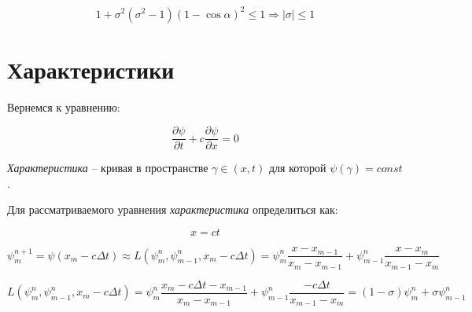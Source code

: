\documentclass[10pt,a4paper]{article}
\begin{document}
	\begin{equation}
		1 +\sigma^{2}\left(\sigma^{2} - 1\right)\left(1 - \cos\alpha\right)^{2} 
		\leqslant 1 \Rightarrow \left|\sigma\right|\leqslant 1
	\end{equation}
	
	\section{Характеристики}
	
	Вернемся к уравнению:
	
	\begin{equation}
		\frac{\partial \psi}{\partial t} + c\frac{\partial \psi}{\partial x} = 0
	\end{equation}
	
	\textit{Характеристика} -- кривая в пространстве $\gamma \in \left(x, t
	\right)$ для которой $\psi\left(\gamma\right) = const$.
	
	Для рассматриваемого уравнения \textit{характеристика} определиться как:
	
	\begin{equation}
		x = ct
	\end{equation}
	
	\begin{equation}
		\psi_{m}^{n + 1} = \psi\left(x_{m} - c\Delta t\right) \approx 
		L\left(\psi^{n}_{m}, \psi_{m - 1}^{n}, x_{m} - c\Delta t\right) = 
		\psi_{m}^{n}\frac{x - x_{m - 1}}{x_{m} - x_{m - 1}} + \psi_{m - 1}^{n}
		\frac{x - x_{m}}{x_{m - 1} - x_{m}}
	\end{equation}
	
	\begin{equation}
		L\left(\psi_{m}^{n}, \psi_{m - 1}^{n}, x_{m} - c\Delta t\right) = 
		\psi_{m}^{n}\frac{x_{m} - c\Delta t - x_{m - 1}}{x_{m} - x_{m - 1}} + 
		\psi_{m - 1}^{n}\frac{-c\Delta t}{x_{m - 1} - x_{m}} = 
		\left(1 - \sigma\right)\psi_{m}^{n} + \sigma\psi_{m - 1}^{n}
	\end{equation}
\end{document}
